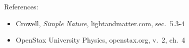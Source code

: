 References:
\begin{itemize}
\item Crowell, \emph{Simple Nature}, lightandmatter.com, sec.~5.3-4
\item OpenStax University Physics, openstax.org, v.~2, ch.~4
\end{itemize}
